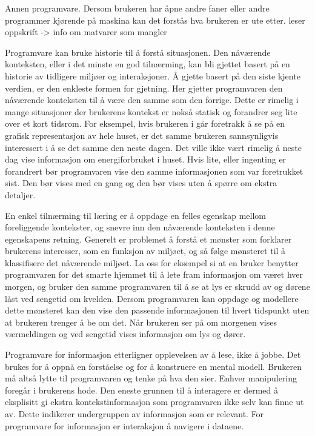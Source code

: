 Annen programvare. Dersom brukeren har åpne andre faner eller andre programmer kjørende på maskina kan det forstås hva brukeren er ute etter. {\color{red}leser oppskrift -> info om matvarer som mangler}

Programvare kan bruke historie til å forstå situasjonen. Den nåværende konteksten, eller i det minste en god tilnærming, kan bli gjettet basert på en historie av tidligere miljøer og interaksjoner. Å gjette basert på den siste kjente verdien, er den enkleste formen for gjetning. Her gjetter programvaren den nåværende konteksten til å være den samme som den forrige. Dette er rimelig i mange situasjoner der brukerens kontekst er nokså statisk og forandrer seg lite over et kort tidsrom. For eksempel, hvis brukeren i går foretrakk å se på en grafisk representasjon av hele huset, er det samme brukeren sannsynligvis interessert i å se det samme den neste dagen. Det ville ikke vært rimelig å neste dag vise informasjon om energiforbruket i huset. Hvis lite, eller ingenting er forandrert bør programvaren vise den samme informasjonen som var foretrukket sist. Den bør vises med en gang og den bør vises uten å spørre om ekstra detaljer.

En enkel tilnærming til læring er å oppdage en felles egenskap mellom foreliggende kontekster, og snevre inn den nåværende konteksten i denne egenskapens retning. Generelt er problemet å forstå et mønster som forklarer brukerens interesser, som en funksjon av miljøet, og så følge mønsteret til å klassifisere det nåværende miljøet. La oss for eksempel si at en bruker benytter programvaren for det smarte hjemmet til å lete fram informasjon om været hver morgen, og bruker den samme programvaren til å se at lys er skrudd av og dørene låst ved sengetid om kvelden. Dersom programvaren kan oppdage og modellere dette mønsteret kan den vise den passende informasjonen til hvert tidspunkt uten at brukeren trenger å be om det. Når brukeren ser på om morgenen vises værmeldingen og ved sengetid vises informasjon om lys og dører.

Programvare for informasjon etterligner opplevelsen av å lese, ikke å jobbe. Det brukes for å oppnå en forståelse og for å konstruere en mental modell. Brukeren må altså lytte til programvaren og tenke på hva den sier. Enhver manipulering foregår i brukerens hode. Den eneste grunnen til å interagere er dermed å eksplisitt gi ekstra kontekstinformasjon som programvaren ikke selv kan finne ut av. Dette indikerer undergruppen av informasjon som er relevant. For programvare for informasjon er interaksjon å navigere i dataene.

